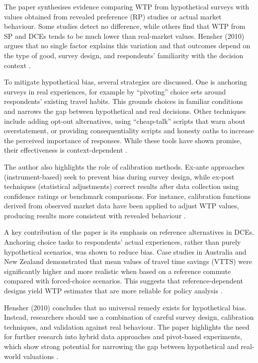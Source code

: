\documentclass[a4paper, 12pt, twoside]{report}  %
\begin{document}
\indent The paper synthesises evidence comparing WTP from hypothetical surveys with values obtained from revealed preference (RP) studies or actual market behaviour. Some studies detect no difference, while others find that WTP from SP and DCEs tends to be much lower than real-market values. Hensher (2010) \cite{hypotheticalbias} argues that no single factor explains this variation and that outcomes depend on the type of good, survey design, and respondents’ familiarity with the decision context \cite{hypotheticalbias}.

\indent To mitigate hypothetical bias, several strategies are discussed. One is anchoring surveys in real experiences, for example by “pivoting” choice sets around respondents’ existing travel habits. This grounds choices in familiar conditions and narrows the gap between hypothetical and real decisions. Other techniques include adding opt-out alternatives, using “cheap-talk” scripts that warn about overstatement, or providing consequentiality scripts and honesty oaths to increase the perceived importance of responses. While these tools have shown promise, their effectiveness is context-dependent \cite{hypotheticalbias}.

\indent The author also highlights the role of calibration methods. Ex-ante approaches (instrument-based) seek to prevent bias during survey design, while ex-post techniques (statistical adjustments) correct results after data collection using confidence ratings or benchmark comparisons. For instance, calibration functions derived from observed market data have been applied to adjust WTP values, producing results more consistent with revealed behaviour \cite{hypotheticalbias}.

\indent A key contribution of the paper is its emphasis on reference alternatives in DCEs. Anchoring choice tasks to respondents’ actual experiences, rather than purely hypothetical scenarios, was shown to reduce bias. Case studies in Australia and New Zealand demonstrated that mean values of travel time savings (VTTS) were significantly higher and more realistic when based on a reference commute compared with forced-choice scenarios. This suggests that reference-dependent designs yield WTP estimates that are more reliable for policy analysis \cite{hypotheticalbias}.

\indent Hensher (2010) \cite{hypotheticalbias} concludes that no universal remedy exists for hypothetical bias. Instead, researchers should use a combination of careful survey design, calibration techniques, and validation against real behaviour. The paper highlights the need for further research into hybrid data approaches and pivot-based experiments, which show strong potential for narrowing the gap between hypothetical and real-world valuations \cite{hypotheticalbias}.
\end{document}
